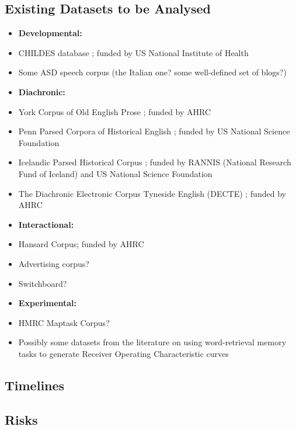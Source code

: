 \documentclass[11pt]{article}
\begin{document}
\subsection{Existing Datasets to be Analysed}
\begin{itemize}
	\item[] \textbf{Developmental:}
	\item CHILDES database \citep{macwhinney1996,macwhinney2014}; funded by US National Institute of Health
	\item Some ASD speech corpus (the Italian one? some well-defined set of blogs?)
	\item[] \textbf{Diachronic:}
	\item York Corpus of Old English Prose \citep{ycoe}; funded by AHRC
	\item Penn Parsed Corpora of Historical English \citep{ppcme24, ppceme, ppcmbe2}; funded by US National Science Foundation
	\item Icelandic Parsed Historical Corpus \citep{icepahc09}; funded by RANNIS (National Research Fund of Iceland) and US National Science Foundation
	\item The Diachronic Electronic Corpus Tyneside English (DECTE) \cite{decte}; funded by AHRC
	\item[] \textbf{Interactional:}
	\item Hansard Corpus; funded by AHRC
	\item Advertising corpus?
	\item Switchboard?
	\item[] \textbf{Experimental:}
	\item HMRC Maptask Corpus?
	\item Possibly some datasets from the literature on using word-retrieval memory tasks to generate Receiver Operating Characteristic curves
\end{itemize}

\subsection{Timelines}

\subsection{Risks}
\end{document}

